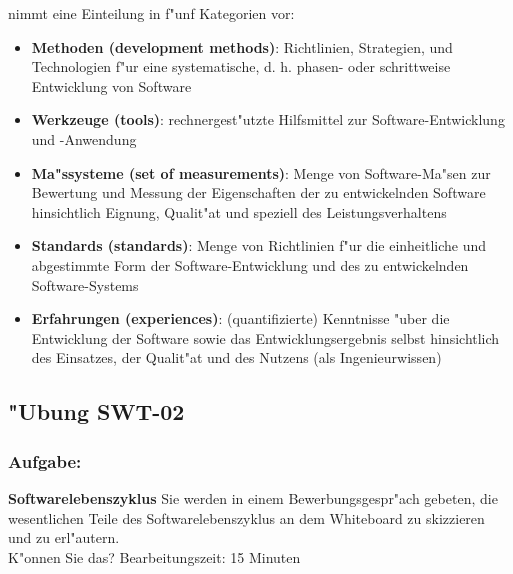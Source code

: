 \newpage

\autocite{Dumke2001} nimmt eine Einteilung in f"unf Kategorien vor:
\bigbreak
\begin{itemize}
\item \textbf{Methoden (development methods)}: \smallbreak Richtlinien, Strategien, und Technologien f"ur eine systematische, d. h. phasen- oder schrittweise Entwicklung von Software

\item \textbf{Werkzeuge (tools)}: \smallbreak rechnergest"utzte Hilfsmittel zur Software-Entwicklung und -Anwendung

\item \textbf{Ma"ssysteme (set of measurements)}: \smallbreak Menge von Software-Ma"sen zur Bewertung und Messung der Eigenschaften der zu entwickelnden Software hinsichtlich Eignung, Qualit"at und speziell des Leistungsverhaltens

\item \textbf{Standards (standards)}: \smallbreak Menge von Richtlinien f"ur die einheitliche und abgestimmte Form der Software-Entwicklung und des zu entwickelnden Software-Systems

\item \textbf{Erfahrungen (experiences)}: \smallbreak (quantifizierte) Kenntnisse "uber die Entwicklung der Software sowie das Entwicklungsergebnis selbst hinsichtlich des Einsatzes, der Qualit"at und des Nutzens (als Ingenieurwissen)
\end{itemize}


\newtheorem{defi}{Definition:}
\newpage
\subsection{"Ubung SWT-02}
\subsubsection*{Aufgabe:}

\begin{framed}
\textbf{Softwarelebenszyklus}
\smallbreak
Sie werden in einem Bewerbungsgespr"ach gebeten, die wesentlichen Teile des Softwarelebenszyklus an dem Whiteboard zu skizzieren und zu erl"autern.
\\ K"onnen Sie das?
\bigbreak
\small Bearbeitungszeit: 15 Minuten
\end{framed}
\bigbreak
\bigbreak
